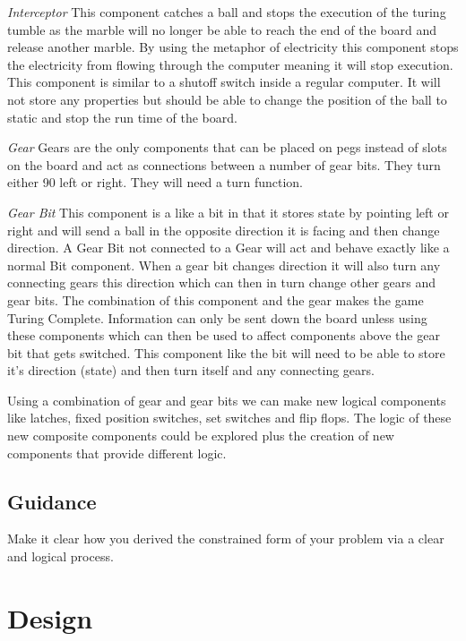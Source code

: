 \documentclass{l4proj}
\begin{document}
\emph{Interceptor}
This component catches a ball and stops the execution of the turing tumble as the marble will no longer be able to reach the end of the board and release another marble. 
By using the metaphor of electricity this component stops the electricity from flowing through the computer meaning it will stop execution.
This component is similar to a shutoff switch inside a regular computer. It will not store any properties but should be able to change the position of the ball to static and 
stop the run time of the board.

\emph{Gear}
Gears are the only components that can be placed on pegs instead of slots on the board and act as connections between a number of gear bits. They turn either 90 left or right. They will need a turn function.

\emph{Gear Bit}
This component is a like a bit in that it stores state by pointing left or right and will send a ball in the opposite direction it is facing and then change direction.
A Gear Bit not connected to a Gear will act and behave exactly like a normal Bit component. When a gear bit changes direction it will also turn any connecting gears this direction which can 
then in turn change other gears and gear bits. The combination of this component and the gear makes the game Turing Complete. 
Information can only be sent down the board unless using these components which can then be used to affect components above the gear bit that gets switched.
This component like the bit will need to be able to store it's direction (state) and then turn itself and any connecting gears.

Using a combination of gear and gear bits we can make new logical components like latches, fixed position switches, set switches and flip flops. The logic of these
new composite components could be explored plus the creation of new components that provide different logic.
\section{Guidance}
Make it clear how you derived the constrained form of your problem via a clear and logical process. 

\chapter{Design}
\end{document}
